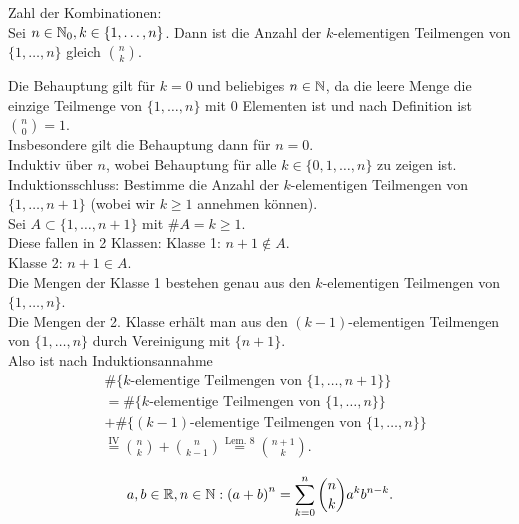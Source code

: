 \documentclass[../ana1.tex]{subfiles}
\begin{document}
\begin{satz}
	Zahl der Kombinationen:\\
	Sei \( n\in\mathbb{N}_0, k\in \{1,\ldots,n\} \). Dann ist die Anzahl der \(k\)-elementigen Teilmengen von \( \{1,\ldots,n\} \) gleich \( \binom{n}{k} \).
\end{satz}
\begin{bew}
	Die Behauptung gilt für \(k=0\) und beliebiges \(n\in\mathbb{N} \), da die leere Menge die einzige Teilmenge von \( \{1,\ldots,n\} \) mit 0 Elementen ist und nach Definition ist \( \binom{n}{0} = 1 \).\\
	Insbesondere gilt die Behauptung dann für \(n=0\).\\
	Induktiv über \(n\), wobei Behauptung für alle \(k\in \{0,1,\ldots,n\} \) zu zeigen ist.\\
	Induktionsschluss: Bestimme die Anzahl der \(k\)-elementigen Teilmengen von \( \{ 1,\ldots,n+1 \} \) (wobei wir \(k\geq 1\) annehmen können).\\
	Sei \(A\subset \{1,\ldots,n+1\} \) mit \( \#A = k\geq 1\). \\
	Diese fallen in 2 Klassen:
	Klasse 1: \(n+1 \notin A\).\\
	Klasse 2: \(n+1 \in A\).\\
	Die Mengen der Klasse 1 bestehen genau aus den \(k\)-elementigen Teilmengen von \( \{1,\ldots,n\} \).\\
	Die Mengen der 2. Klasse erhält man aus den \((k-1)\)-elementigen Teilmengen von \( \{1,\ldots,n\} \) durch Vereinigung mit \( \{n+1\} \).\\
	Also ist nach Induktionsannahme
	\begin{align*}
		 &  \# \{k\text{-elementige Teilmengen von } \{1,\ldots,n+1\} \}                                     \\
		 &= \# \{k\text{-elementige Teilmengen von } \{1,\ldots,n\} \}                                      \\
		 &+ \# \{(k-1)\text{-elementige Teilmengen von } \{1,\ldots,n\} \} \\
		 &  \overset{\text{IV}}{=} \binom{n}{k} + \binom{n}{k-1} \overset{\text{Lem. 8}}{=} \binom{n+1}{k}.
	\end{align*}
\end{bew}

\begin{satz}
	\[ a,b\in\mathbb{R},n\in\mathbb{N}:{(a+b)}^n = \sum_{k=0}^{n} \binom{n}{k} a^k b^{n-k}. \]
\end{satz}
\end{document}
